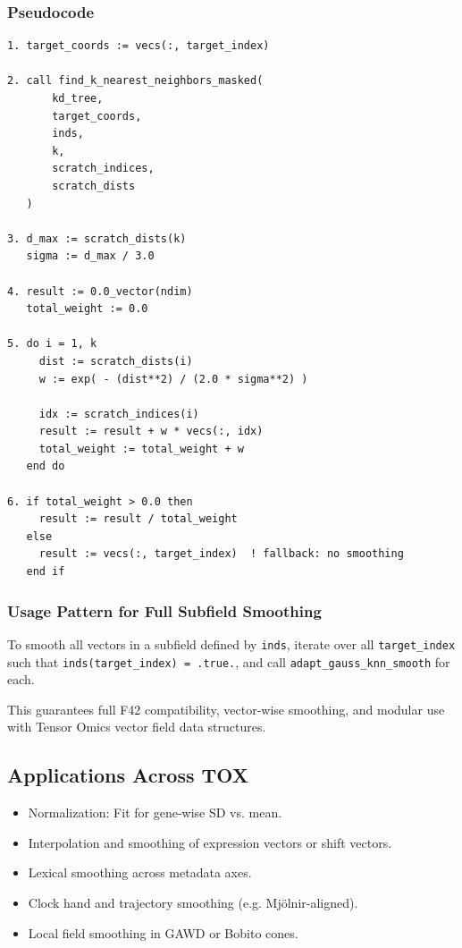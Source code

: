 \documentclass{article}
\begin{document}
\subsubsection*{Pseudocode}

\begin{verbatim}
1. target_coords := vecs(:, target_index)

2. call find_k_nearest_neighbors_masked(
       kd_tree,
       target_coords,
       inds,
       k,
       scratch_indices,
       scratch_dists
   )

3. d_max := scratch_dists(k)
   sigma := d_max / 3.0

4. result := 0.0_vector(ndim)
   total_weight := 0.0

5. do i = 1, k
     dist := scratch_dists(i)
     w := exp( - (dist**2) / (2.0 * sigma**2) )

     idx := scratch_indices(i)
     result := result + w * vecs(:, idx)
     total_weight := total_weight + w
   end do

6. if total_weight > 0.0 then
     result := result / total_weight
   else
     result := vecs(:, target_index)  ! fallback: no smoothing
   end if
\end{verbatim}

\subsubsection*{Usage Pattern for Full Subfield Smoothing}

To smooth all vectors in a subfield defined by \texttt{inds}, iterate over all \texttt{target\_index} such that \texttt{inds(target\_index) = .true.}, and call \texttt{adapt\_gauss\_knn\_smooth} for each.

This guarantees full F42 compatibility, vector-wise smoothing, and modular use with Tensor Omics vector field data structures.

\subsection{Applications Across TOX}

\begin{itemize}
  \item Normalization: Fit for gene-wise SD vs. mean.
  \item Interpolation and smoothing of expression vectors or shift vectors.
  \item Lexical smoothing across metadata axes.
  \item Clock hand and trajectory smoothing (e.g. Mjölnir-aligned).
  \item Local field smoothing in GAWD or Bobito cones.
\end{itemize}
\end{document}
